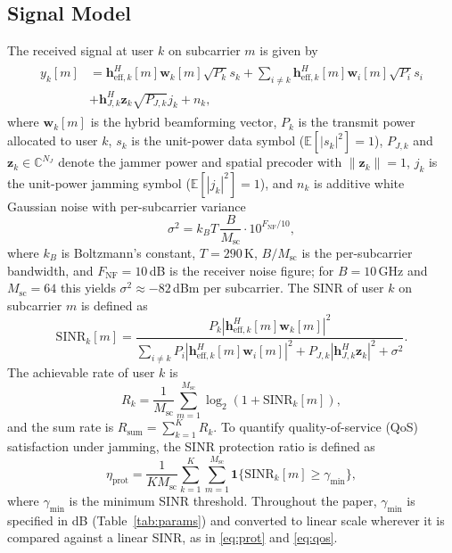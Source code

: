 \documentclass[10pt,conference]{IEEEtran}
\newcommand{\E}{\mathbb{E}}
\begin{document}
\subsection{Signal Model}

The received signal at user $k$ on subcarrier $m$ is given by
\begin{align}
\begin{split}
y_k[m] &= \mathbf{h}_{\mathrm{eff},k}^H[m]\mathbf{w}_k[m]\sqrt{P_k}s_k + \sum_{i \neq k} \mathbf{h}_{\mathrm{eff},k}^H[m]\mathbf{w}_i[m]\sqrt{P_i}s_i \\ 
&+ \mathbf{h}_{J,k}^H \mathbf{z}_k \sqrt{P_{J,k}} j_k + n_k,  
\end{split}
\end{align}
where $\mathbf{w}_k[m]$ is the hybrid beamforming vector, $P_k$ is the transmit power allocated to user $k$, $s_k$ is the unit-power data symbol ($\E[|s_k|^2]=1$), $P_{J,k}$ and $\mathbf{z}_k \in \mathbb{C}^{N_J}$ denote the jammer power and spatial precoder with $\|\mathbf{z}_k\|=1$, $j_k$ is the unit-power jamming symbol ($\E[|j_k|^2]=1$), and $n_k$ is additive white Gaussian noise with per-subcarrier variance
\begin{equation}
\sigma^2 = k_B T \, \frac{B}{M_{\mathrm{sc}}} \cdot 10^{F_{\mathrm{NF}}/10},
\label{eq:noise}
\end{equation}
where $k_B$ is Boltzmann's constant, $T=290$\,K, $B/M_{\mathrm{sc}}$ is the per-subcarrier bandwidth, and $F_{\mathrm{NF}}=10$\,dB is the receiver noise figure; for $B=10$\,GHz and $M_{\mathrm{sc}}=64$ this yields $\sigma^2 \approx -82$\,dBm per subcarrier.
The SINR of user $k$ on subcarrier $m$ is defined as
\begin{equation}
\mathrm{SINR}_k[m] \!=\!
\frac{P_k |\mathbf{h}_{\mathrm{eff},k}^H[m]\mathbf{w}_k[m]|^2}
{\sum_{i \neq k}\! P_i |\mathbf{h}_{\mathrm{eff},k}^H[m]\mathbf{w}_i[m]|^2
\!+ \!P_{J,k} |\mathbf{h}_{J,k}^H \mathbf{z}_k|^2 \!+\! \sigma^2 }.
\label{eq:sinr}
\end{equation}
The achievable rate of user $k$ is
\begin{equation}
R_k = \frac{1}{M_{\mathrm{sc}}} \sum_{m=1}^{M_{\mathrm{sc}}}
\log_2\left(1 + \mathrm{SINR}_k[m]\right),
\label{eq:rate}
\end{equation}
and the sum rate is $R_{\mathrm{sum}} = \sum_{k=1}^{K} R_k$.
To quantify quality-of-service (QoS) satisfaction under jamming, the SINR protection ratio is defined as
\begin{equation}
\eta_{\mathrm{prot}} =
\frac{1}{K M_{\mathrm{sc}}}
\sum_{k=1}^{K}\sum_{m=1}^{M_{\mathrm{sc}}}
\mathbf{1}\{\mathrm{SINR}_k[m] \geq \gamma_{\min}\},
\label{eq:prot}
\end{equation}
where $\gamma_{\min}$ is the minimum SINR threshold. Throughout the paper, $\gamma_{\min}$ is specified in dB (Table~\ref{tab:params}) and converted to linear scale wherever it is compared against a linear SINR, as in \eqref{eq:prot} and \eqref{eq:qos}.
\end{document}
